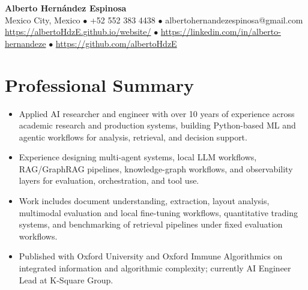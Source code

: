 \documentclass{article}
\begin{document}
\begin{center}
\textbf{Alberto Hern\'andez Espinosa} \\
Mexico City, Mexico $\bullet$ +52 552 383 4438 $\bullet$ albertohernandezespinosa@gmail.com \\
\url{https://albertoHdzE.github.io/website/} $\bullet$ \url{https://linkedin.com/in/alberto-hernandeze} $\bullet$ \url{https://github.com/albertoHdzE}
\end{center}

\section{Professional Summary}
\begin{itemize}
\item Applied AI researcher and engineer with over 10 years of experience across academic research and production systems, building Python-based ML and agentic workflows for analysis, retrieval, and decision support.
\item Experience designing multi-agent systems, local LLM workflows, RAG/GraphRAG pipelines, knowledge-graph workflows, and observability layers for evaluation, orchestration, and tool use.
\item Work includes document understanding, extraction, layout analysis, multimodal evaluation and local fine-tuning workflows, quantitative trading systems, and benchmarking of retrieval pipelines under fixed evaluation workflows.
\item Published with Oxford University and Oxford Immune Algorithmics on integrated information and algorithmic complexity; currently AI Engineer Lead at K-Square Group.
\end{itemize}
\end{document}
